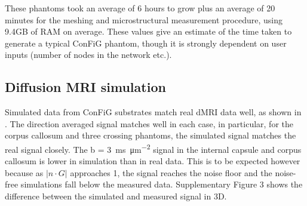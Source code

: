 These phantoms took an average of 6 hours to grow plus an average of 20 minutes for the meshing and microstructural measurement procedure, using 9.4GB of RAM on average. These values give an estimate of the time taken to generate a typical ConFiG phantom, though it is strongly dependent on user inputs (number of nodes in the network etc.).

\subsection{Diffusion MRI simulation}
\label{sec:config_result_dmri_sim}
Simulated data from ConFiG substrates match real dMRI data well, as shown in . The direction averaged signal matches well in each case, in particular, for the corpus callosum and three crossing phantoms, the simulated signal matches the real signal closely. The b = \SI{3}{\milli\second\per\micro\metre\squared} signal in the internal capsule and corpus callosum is lower in simulation than in real data. This is to be expected however because as $|n\cdot G|$ approaches 1, the signal reaches the noise floor and the noise-free simulations fall below the measured data. Supplementary Figure 3 shows the difference between the simulated and measured signal in 3D.

